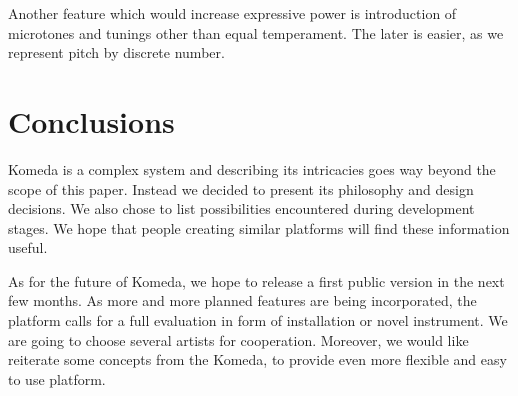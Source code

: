 \documentclass{article}
\begin{document}
Another feature which would increase expressive power is introduction of
microtones and tunings other than equal temperament. The later is easier, as we
represent pitch by discrete number.

\section{Conclusions}

Komeda is a complex system and describing its intricacies goes way beyond the
scope of this paper. Instead we decided to present its philosophy and design
decisions. We also chose to list possibilities encountered during development
stages. We hope that people creating similar platforms will find these
information useful.

As for the future of Komeda, we hope to release a first public version in the
next few months. As more and more planned features are being incorporated, the
platform calls for a full evaluation in form of installation or novel
instrument. We are going to choose several artists for cooperation. Moreover,
we would like reiterate some concepts from the Komeda, to provide even more
flexible and easy to use platform.


\end{document}
